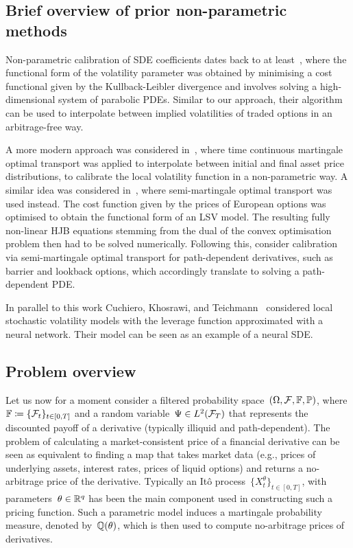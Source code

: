 \subsection{Brief overview of prior non-parametric methods}

Non-parametric calibration of SDE coefficients dates back to at least~\cite{Avellaneda1997CalibratingMinimization}, where the functional form of the volatility parameter was obtained by minimising a cost functional given by the Kullback-Leibler divergence and involves solving a high-dimensional system of parabolic PDEs. Similar to our approach, their algorithm can be used to interpolate between implied volatilities of traded options in an arbitrage-free way.

A more modern approach was considered in~\cite{Guo2017LocalTransport}, where time continuous martingale optimal transport was applied to interpolate between initial and final asset price distributions, to calibrate the local volatility function in a non-parametric way. 
A similar idea was considered in~\cite{Guo2022CalibrationTransport}, where semi-martingale optimal transport was used instead. 
The cost function given by the prices of European options was optimised to obtain the functional form of an LSV model. The resulting fully non-linear HJB equations stemming from the dual of the convex optimisation problem then had to be solved numerically. Following this, \cite{Guo2021PathDerivatives} consider calibration via semi-martingale optimal transport for path-dependent derivatives, such as barrier and lookback options, which accordingly translate to solving a path-dependent PDE.

In parallel to this work Cuchiero, Khosrawi, and Teichmann~\cite{Cuchiero2020AModels} considered local stochastic volatility models with the leverage function approximated with a neural network. Their model can be seen as an example of a neural SDE.

\subsection{Problem overview}\label{sec problem overview}

Let us now for a moment consider a filtered probability space~$(\Omega, \mathcal{F}, \mathbb{F},\mathbb{P})$, where ${\mathbb{F}\coloneqq \{\mathcal{F}_t\}_{t\in[0, T]}}$ and a random variable~$\Psi \in L^2(\mathcal{F}_T)$ that represents the discounted payoff of a derivative (typically illiquid and path-dependent). 
The problem of calculating a market-consistent price of a financial derivative can be seen as equivalent to finding a map that takes market data (e.g., prices of underlying assets, interest rates, prices of liquid options) and returns a no-arbitrage price of the derivative.
Typically an It\^{o} process~$\{X_t^\theta\}_{{t}\in[0, T]}$, with parameters~$\theta \in \mathbb{R}^q$ has been the main component used in constructing such a pricing function. 
Such a parametric model induces a martingale probability measure, denoted by~$\mathbb{Q}(\theta)$, which is then used to compute no-arbitrage prices of derivatives.

